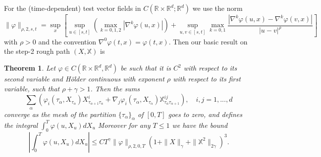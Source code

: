 \documentclass[a4paper,11pt]{article}
\newtheorem{theorem}{Theorem}[section]
\newcommand{\R}{\mathbb{R}}
\begin{document}
For the (time-dependent) test vector fields in $C(\R \times \R^d; \R^d)$
 we use the norm
$$
\|\varphi\|_{\rho,2,s,t} = \sup_x \left[ \sup_{u\in[s,t]}
\left(\max_{k=0,1,2} |\nabla^k \varphi(u,x)|\right) +
 \sup_{u,v \in[s,t]} \max_{k=0,1}
\frac{|\nabla^k \varphi(u,x)-\nabla^k \varphi(v,x)|}{|u-v|^\rho} 
\right]
$$
with $\rho > 0$ and the convention $\nabla^0 \varphi(t,x) = 
\varphi(t,x)$. 
Then our basic result on the step-2 rough path $(X,\mathbb{X})$  is

\begin{theorem}
\label{th:rough-main}
Let $\varphi \in C(\R \times \R^d,\R^d)$ be such that it is $C^2$ 
with respect to its second variable and H\"older continuous with
exponent $\rho$ with respect to its first variable, such that 
$\rho+\gamma > 1$. Then the sums
$$
\sum_\alpha \left(\varphi_i(\tau_\alpha,X_{\tau_\alpha}) 
X^i_{\tau_{\alpha+1} \tau_\alpha}+\nabla_j 
\varphi_i(\tau_\alpha,X_{\tau_\alpha}) 
\mathbb{X}_{ \tau_\alpha \tau_{\alpha+1}}^{ij} \right), 
\quad i,j=1,...,d
$$
converge as the mesh of the partition $\{\tau_\alpha\}_{\alpha}$ of
$[0,T]$ goes to zero, and defines the integral
$
\int_0^T \varphi(u,X_u) dX_u 
$ 
Moreover for any $T\le 1$ we have the bound
$$
\left|\int_0^T \varphi(u,X_u) dX_u \right| \le C T^\gamma  
\|\varphi\|_{\rho,2,0,T} (1+\|X\|_\gamma+\|\mathbb{X}^2\|_{2\gamma})^3.
$$
\end{theorem}
\end{document}
